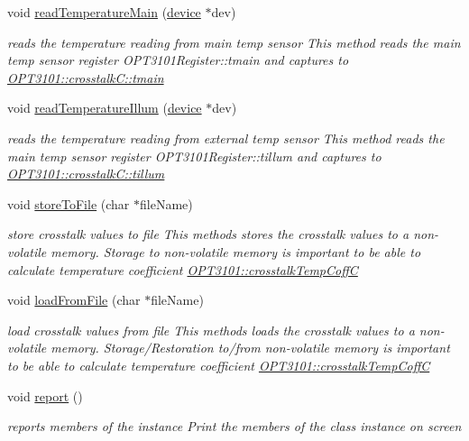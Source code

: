 \begin{DoxyCompactItemize}
void \mbox{\hyperlink{class_o_p_t3101_1_1crosstalk_c_a44bdf91acac0c969a89507ab2139e3b6}{read\+Temperature\+Main}} (\mbox{\hyperlink{class_o_p_t3101_1_1device}{device}} $\ast$dev)
\begin{DoxyCompactList}\small\item\em reads the temperature reading from main temp sensor This method reads the main temp sensor register O\+P\+T3101\+Register\+::tmain and captures to \mbox{\hyperlink{class_o_p_t3101_1_1crosstalk_c_a8b7250b531e953587c665c2c43860d82}{O\+P\+T3101\+::crosstalk\+C\+::tmain}} \end{DoxyCompactList}\item 
void \mbox{\hyperlink{class_o_p_t3101_1_1crosstalk_c_ad9045229556d3fe0c840e0e1113333d4}{read\+Temperature\+Illum}} (\mbox{\hyperlink{class_o_p_t3101_1_1device}{device}} $\ast$dev)
\begin{DoxyCompactList}\small\item\em reads the temperature reading from external temp sensor This method reads the main temp sensor register O\+P\+T3101\+Register\+::tillum and captures to \mbox{\hyperlink{class_o_p_t3101_1_1crosstalk_c_ab1d1d581f0495f5695ad49a2a8a41fd3}{O\+P\+T3101\+::crosstalk\+C\+::tillum}} \end{DoxyCompactList}\item 
void \mbox{\hyperlink{class_o_p_t3101_1_1crosstalk_c_a7d887d736dd5a3aa9dd81224e67240b8}{store\+To\+File}} (char $\ast$file\+Name)
\begin{DoxyCompactList}\small\item\em store crosstalk values to file This methods stores the crosstalk values to a non-\/volatile memory. Storage to non-\/volatile memory is important to be able to calculate temperature coefficient \mbox{\hyperlink{class_o_p_t3101_1_1crosstalk_temp_coff_c}{O\+P\+T3101\+::crosstalk\+Temp\+CoffC}} \end{DoxyCompactList}\item 
void \mbox{\hyperlink{class_o_p_t3101_1_1crosstalk_c_a8927a7e31870bf41a64d8b1755c6b0b2}{load\+From\+File}} (char $\ast$file\+Name)
\begin{DoxyCompactList}\small\item\em load crosstalk values from file This methods loads the crosstalk values to a non-\/volatile memory. Storage/\+Restoration to/from non-\/volatile memory is important to be able to calculate temperature coefficient \mbox{\hyperlink{class_o_p_t3101_1_1crosstalk_temp_coff_c}{O\+P\+T3101\+::crosstalk\+Temp\+CoffC}} \end{DoxyCompactList}\item 
void \mbox{\hyperlink{class_o_p_t3101_1_1crosstalk_c_a8a611602b13d6f3e97049696ddebe209}{report}} ()
\begin{DoxyCompactList}\small\item\em reports members of the instance Print the members of the class instance on screen \end{DoxyCompactList}\end{DoxyCompactItemize}
